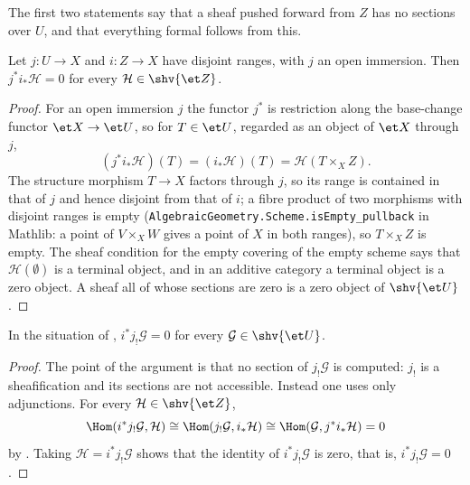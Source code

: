 The first two statements say that a sheaf pushed forward from $Z$ has no
sections over $U$, and that everything formal follows from this.

\begin{lemma}[$j^*i_*$ vanishes]
\label{lemma:openclosed-vanishing-lowerStar}
\leanok
Let $j\colon U\to X$ and $i\colon Z\to X$ have disjoint ranges, with $j$ an
open immersion.  Then $j^*i_*\mathcal H=0$ for every
$\mathcal H\in\shv{\et Z}$.
\end{lemma}
\begin{proof}
\leanok
For an open immersion $j$ the functor $j^*$ is restriction along the
base-change functor $\et X\to\et U$, so for $T\in\et U$, regarded as an
object of $\et X$ through $j$,
\[
  (j^*i_*\mathcal H)(T)=(i_*\mathcal H)(T)=\mathcal H(T\times_XZ).
\]
The structure morphism $T\to X$ factors through $j$, so its range is
contained in that of $j$ and hence disjoint from that of $i$; a fibre product
of two morphisms with disjoint ranges is empty
(\texttt{AlgebraicGeometry.Scheme.isEmpty\_pullback} in Mathlib: a point of
$V\times_XW$ gives a point of $X$ in both ranges), so $T\times_XZ$ is empty.
The
sheaf condition for the empty covering of the empty scheme says that
$\mathcal H(\emptyset)$ is a terminal object, and in an additive category a
terminal object is a zero object.  A sheaf all of whose sections are zero is
a zero object of $\shv{\et U}$.
\end{proof}

\begin{lemma}[$i^*j_!$ vanishes]
\label{lemma:openclosed-vanishing-lowerShriek}
\leanok
In the situation of ,
$i^*j_!\mathcal G=0$ for every $\mathcal G\in\shv{\et U}$.
\end{lemma}
\begin{proof}
\leanok
The point of the argument is that no section of $j_!\mathcal G$ is computed:
$j_!$ is a sheafification and its sections are not accessible.  Instead one
uses only adjunctions.  For every $\mathcal H\in\shv{\et Z}$,
\[
  \Hom(i^*j_!\mathcal G,\mathcal H)
  \cong\Hom(j_!\mathcal G,i_*\mathcal H)
  \cong\Hom(\mathcal G,j^*i_*\mathcal H)=0
\]
by .  Taking
$\mathcal H=i^*j_!\mathcal G$ shows that the identity of
$i^*j_!\mathcal G$ is zero, that is, $i^*j_!\mathcal G=0$.
\end{proof}

